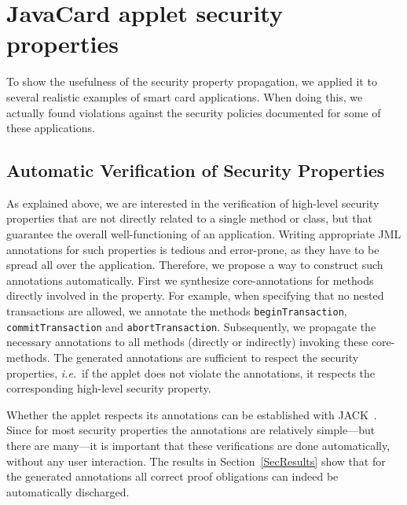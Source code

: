 
\section{JavaCard applet security properties}
To show the usefulness of the security property propagation, we applied it to
several realistic examples of smart card applications. When doing
this, we actually found violations against the security policies
documented for some of these applications.

\subsection{Automatic Verification of Security Properties}\label{SecVerif}
As explained above, we are interested in the verification of
high-level security properties that are not directly related to a
single method or class, but that guarantee the overall
well-functioning of an application. Writing appropriate JML
annotations for such properties is tedious and error-prone, as they
have to be spread all over the application. Therefore, we propose a
way to construct such annotations automatically. First we synthesize
core-annotations for methods directly involved in the property.  For
example, when specifying that no nested transactions are allowed, we
annotate the methods \texttt{beginTransaction},
\texttt{commitTransaction} and
\texttt{abortTransaction}. Subsequently, we propagate the necessary 
annotations to all methods (directly or indirectly) invoking these
core-methods.  The generated annotations are sufficient to respect the
security properties, \emph{i.e.}~if the applet does not violate the
annotations, it respects the corresponding high-level security
property.

Whether the applet respects its annotations can be established with
JACK~\cite{BRL-JACK}.
Since
for most security properties the annotations are relatively
simple---but there are many---it is important that these verifications
are done automatically, without any user interaction. The results in
Section~\ref{SecResults} show that for the generated annotations all
correct proof obligations can indeed be automatically discharged.

